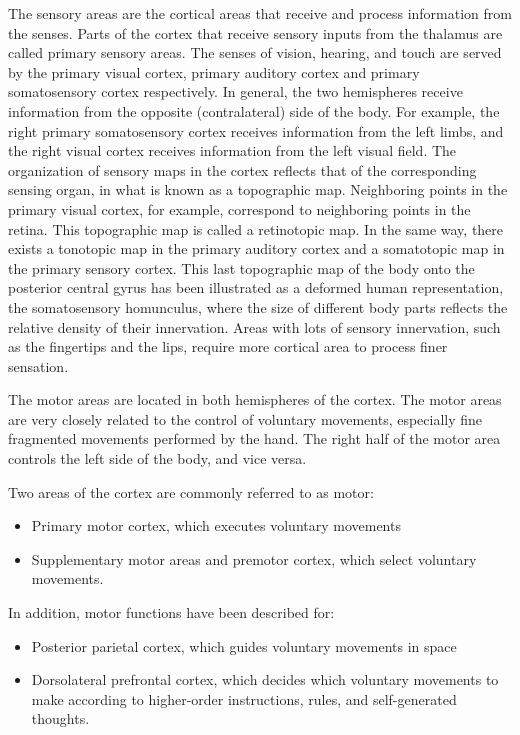 \documentclass[]{book}
\providecommand{\tightlist}{%
  \setlength{\itemsep}{0pt}\setlength{\parskip}{0pt}}
\begin{document}
The sensory areas are the cortical areas that receive and process information from the senses. Parts of the cortex that receive sensory inputs from the thalamus are called primary sensory areas. The senses of vision, hearing, and touch are served by the primary visual cortex, primary auditory cortex and primary somatosensory cortex respectively. In general, the two hemispheres receive information from the opposite (contralateral) side of the body. For example, the right primary somatosensory cortex receives information from the left limbs, and the right visual cortex receives information from the left visual field. The organization of sensory maps in the cortex reflects that of the corresponding sensing organ, in what is known as a topographic map. Neighboring points in the primary visual cortex, for example, correspond to neighboring points in the retina. This topographic map is called a retinotopic map. In the same way, there exists a tonotopic map in the primary auditory cortex and a somatotopic map in the primary sensory cortex. This last topographic map of the body onto the posterior central gyrus has been illustrated as a deformed human representation, the somatosensory homunculus, where the size of different body parts reflects the relative density of their innervation. Areas with lots of sensory innervation, such as the fingertips and the lips, require more cortical area to process finer sensation.

The motor areas are located in both hemispheres of the cortex. The motor areas are very closely related to the control of voluntary movements, especially fine fragmented movements performed by the hand. The right half of the motor area controls the left side of the body, and vice versa.

Two areas of the cortex are commonly referred to as motor:

\begin{itemize}
\tightlist
\item
  Primary motor cortex, which executes voluntary movements
\item
  Supplementary motor areas and premotor cortex, which select voluntary movements.
\end{itemize}

In addition, motor functions have been described for:

\begin{itemize}
\tightlist
\item
  Posterior parietal cortex, which guides voluntary movements in space
\item
  Dorsolateral prefrontal cortex, which decides which voluntary movements to make according to higher-order instructions, rules, and self-generated thoughts.
\end{itemize}
\end{document}
